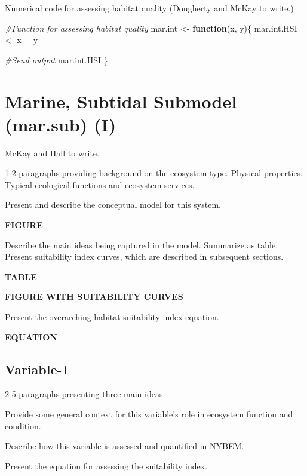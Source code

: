 \documentclass[
]{book}
\newenvironment{Shaded}{\begin{snugshade}}{\end{snugshade}}
\newcommand{\CommentTok}[1]{\textcolor[rgb]{0.56,0.35,0.01}{\textit{#1}}}
\newcommand{\ControlFlowTok}[1]{\textcolor[rgb]{0.13,0.29,0.53}{\textbf{#1}}}
\newcommand{\NormalTok}[1]{#1}
\newcommand{\OtherTok}[1]{\textcolor[rgb]{0.56,0.35,0.01}{#1}}
\newcommand{\SpecialCharTok}[1]{\textcolor[rgb]{0.00,0.00,0.00}{#1}}
\begin{document}
Numerical code for assessing habitat quality ({Dougherty and McKay to write.})

\begin{Shaded}
\begin{Highlighting}[]
\CommentTok{\#Function for assessing habitat quality}
\NormalTok{mar.int }\OtherTok{\textless{}{-}} \ControlFlowTok{function}\NormalTok{(x, y)\{}
\NormalTok{  mar.int.HSI }\OtherTok{\textless{}{-}}\NormalTok{ x }\SpecialCharTok{+}\NormalTok{ y}

  \CommentTok{\#Send output}
\NormalTok{  mar.int.HSI}
\NormalTok{\}}
\end{Highlighting}
\end{Shaded}

\hypertarget{marine-subtidal-submodel-mar.sub-i}{%
\section{Marine, Subtidal Submodel (mar.sub) (I)}\label{marine-subtidal-submodel-mar.sub-i}}

{McKay and Hall to write.}

1-2 paragraphs providing background on the ecosystem type. Physical properties. Typical ecological functions and ecosystem services.

Present and describe the conceptual model for this system.

\textbf{FIGURE}

Describe the main ideas being captured in the model. Summarize as table. Present suitability index curves, which are described in subsequent sections.

\textbf{TABLE}

\textbf{FIGURE WITH SUITABILITY CURVES}

Present the overarching habitat suitability index equation.

\textbf{EQUATION}

\hypertarget{variable-1-3}{%
\subsection{Variable-1}\label{variable-1-3}}

2-5 paragraphs presenting three main ideas.

Provide some general context for this variable's role in ecosystem function and condition.

Describe how this variable is assessed and quantified in NYBEM.

Present the equation for assessing the suitability index.
\end{document}
